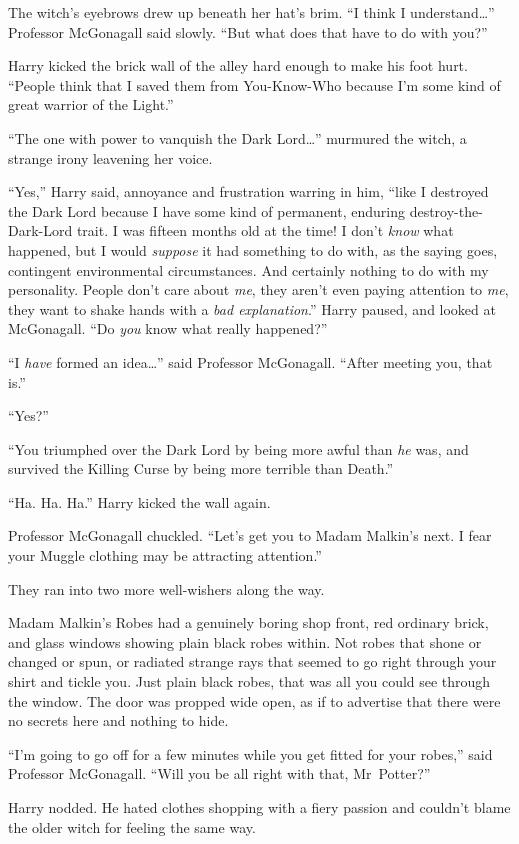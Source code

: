 The witch’s eyebrows drew up beneath her hat’s brim. “I think I understand…” Professor McGonagall said slowly. “But what does that have to do with you?”

Harry kicked the brick wall of the alley hard enough to make his foot hurt. “People think that I saved them from You-Know-Who because I’m some kind of great warrior of the Light.”

“The one with power to vanquish the Dark Lord…” murmured the witch, a strange irony leavening her voice.

“Yes,” Harry said, annoyance and frustration warring in him, “like I destroyed the Dark Lord because I have some kind of permanent, enduring destroy-the-Dark-Lord trait. I was fifteen months old at the time! I don’t \emph{know} what happened, but I would \emph{suppose} it had something to do with, as the saying goes, contingent environmental circumstances. And certainly nothing to do with my personality. People don’t care about \emph{me}, they aren’t even paying attention to \emph{me}, they want to shake hands with a \emph{bad explanation}.” Harry paused, and looked at McGonagall. “Do \emph{you} know what really happened?”

“I \emph{have} formed an idea…” said Professor McGonagall. “After meeting you, that is.”

“Yes?”

“You triumphed over the Dark Lord by being more awful than \emph{he} was, and survived the Killing Curse by being more terrible than Death.”

“Ha. Ha. Ha.” Harry kicked the wall again.

Professor McGonagall chuckled. “Let’s get you to Madam Malkin’s next. I fear your Muggle clothing may be attracting attention.”

They ran into two more well-wishers along the way.

Madam Malkin’s Robes had a genuinely boring shop front, red ordinary brick, and glass windows showing plain black robes within. Not robes that shone or changed or spun, or radiated strange rays that seemed to go right through your shirt and tickle you. Just plain black robes, that was all you could see through the window. The door was propped wide open, as if to advertise that there were no secrets here and nothing to hide.

“I’m going to go off for a few minutes while you get fitted for your robes,” said Professor McGonagall. “Will you be all right with that, Mr~Potter?”

Harry nodded. He hated clothes shopping with a fiery passion and couldn’t blame the older witch for feeling the same way.

